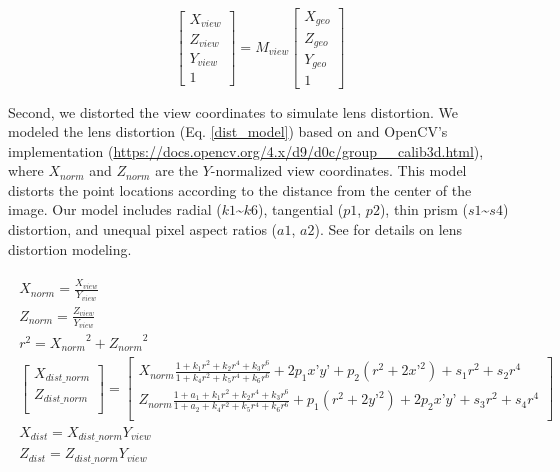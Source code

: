 \documentclass{article}
\begin{document}
\begin{equation}
\label{view_tf}
  \begin{bmatrix} 
    X_{view} \\ Z_{view} \\ Y_{view} \\ 1 
  \end{bmatrix}
  =
  M_{view}
  \begin{bmatrix} 
    X_{geo} \\ Z_{geo} \\ Y_{geo} \\ 1 
  \end{bmatrix}
\end{equation}

Second, we distorted the view coordinates to simulate lens distortion. We modeled the lens distortion (Eq. \ref{dist_model}) based on \cite{Weng1992CameraCalib} and OpenCV's implementation (\url{https://docs.opencv.org/4.x/d9/d0c/group__calib3d.html}), where \(X_{norm}\) and \(Z_{norm}\) are the \(Y\)-normalized view coordinates. This model distorts the point locations according to the distance from the center of the image. Our model includes radial (\(k1\)\textasciitilde{}\(k6\)), tangential (\(p1\), \(p2\)), thin prism (\(s1\)\textasciitilde{}\(s4\)) distortion, and unequal pixel aspect ratios (\(a1\), \(a2\)). See \cite{Weng1992CameraCalib} for details on lens distortion modeling.

\begin{gather}
\label{dist_model}
  \begin{gathered}
  X_{norm} = \frac{X_{view}}{Y_{view}} \\
  Z_{norm} = \frac{Z_{view}}{Y_{view}} \\
  r^2 = {X_{norm}}^2 + {Z_{norm}}^2 \\
  \begin{bmatrix}
    X_{dist\_norm} \\ 
    Z_{dist\_norm} \\
  \end{bmatrix} 
  = 
  \begin{bmatrix} 
    X_{norm} \frac{1 + k_1 r^2 + k_2 r^4 + k_3 r^6}{1 + k_4 r^2 + k_5 r^4 + k_6 r^6} + 2 p_1 x’ y’ + p_2(r^2 + 2 x’^2) + s_1 r^2 + s_2 r^4 \\ 
    Z_{norm} \frac{1 + a_1 + k_1 r^2 + k_2 r^4 + k_3 r^6}{1 + a_2 + k_4 r^2 + k_5 r^4 + k_6 r^6} + p_1 (r^2 + 2 y’^2) + 2 p_2 x’ y’ + s_3 r^2 + s_4 r^4 \\    \end{bmatrix} \\
  X_{dist} = X_{dist\_norm} Y_{view} \\
  Z_{dist} = Z_{dist\_norm} Y_{view} \\
  \end{gathered}
\end{gather}
\end{document}
